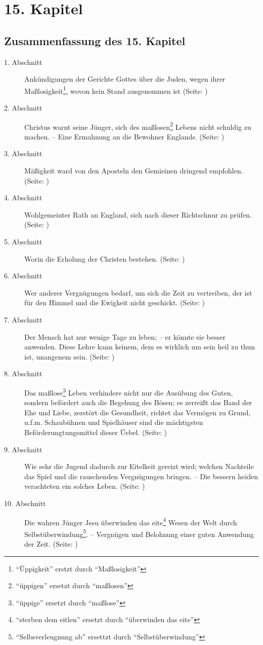 

\chapter{15. Kapitel} \label{kap15}

\section{Zusammenfassung des 15. Kapitel}
\small
\begin{description}
\item[1. Abschnitt] Ankündigungen der Gerichte Gottes über die Juden, wegen
ihrer Maßlosigkeit\footnote{"`Üppigkeit"' erstzt durch "`Maßlosigkeit"'}, wovon
kein Stand ausgenommen ist (Seite: \pageref{kap15_ab1})
\item[2. Abschnitt] Christus warnt seine Jünger, sich des
maßlosen\footnote{"`üppigen"' ersetzt durch "`maßlosen"'} Lebens nicht
schuldig zu machen. -- Eine Ermahnung an die Bewohner Englands. (Seite:
\pageref{kap15_ab2})
\item[3. Abschnitt] Mäßigkeit ward von den Aposteln den Gemieinen dringend
empfohlen. (Seite: \pageref{kap15_ab3})
\item[4. Abschnitt] Wohlgemeinter Rath an England, sich nach dieser Richtschnur
zu prüfen. (Seite: \pageref{kap15_ab4})
\item[5. Abschnitt] Worin die Erholung der Christen bestehen. (Seite:
\pageref{kap15_ab5})
\item[6. Abschnitt] Wer anderer Vergnügungen bedarf, um sich die Zeit zu
vertreiben, der ist für den Himmel und die Ewigkeit nicht geschickt. (Seite:
\pageref{kap15_ab6})
\item[7. Abschnitt] Der Mensch hat nur wenige Tage zu leben; -- er könnte sie
besser anwenden. Diese Lehre kann keinem, dem es wirklich um sein heil zu thun
ist, unangenem sein. (Seite: \pageref{kap15_ab6})
\item[8. Abschnitt] Das maßlose\footnote{"`üppige"' ersetzt durch "`maßlose"'}
Leben verhindere nicht nur die Ausübung des
Guten, sondern befördert auch die Begehung des Bösen; es zerreißt das Band der
Ehe und Liebe, zerstört die Gesundheit, richtet das Vermögen zu Grund, u.f.m.
Schaubühnen und Spielhäuser sind die mächtigsten Beförderungtungsmittel dieser
Üebel. (Seite: \pageref{kap15_ab8})
\item[9. Abschnitt] Wie sehr die Jugend dadurch zur Eitelkeit gereizt wird;
welchen Nachteile das Spiel und die rauschenden Vergnügungen bringen. -- Die
bessern heiden verachteten ein solches Leben. (Seite: \pageref{kap15_ab9})
\item[10. Abschnitt] Die wahren Jünger Jesu überwinden das
eite\footnote{"`sterben dem eitlen"' ersetzt durch "`überwinden das eite"'}
Wesen der Welt
durch Selbstüberwindung\footnote{"`Selbsverleugnung ab"'  ersettzt durch
"`Selbstüberwindung"'}. -- Vergnügen und Belohnung einer guten Anwendung der
Zeit. (Seite: \pageref{kap15_ab10})


\end{description}
